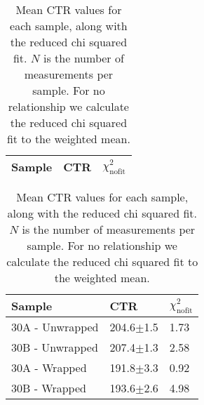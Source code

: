 \begin{table}
\caption{Mean CTR values for each sample, along with the reduced chi squared fit. $N$ is the number of measurements per sample. For no relationship we calculate the reduced chi squared fit to the weighted mean.}
\label{tab:doiresults-ProteusUnwrapped}
\begin{tabular}{lll}
\toprule
Sample &            CTR &   $\chi^2_\text{nofit}$ \\
\midrule
\bottomrule
\end{tabular}
\end{table}

\begin{table}
\caption{\label{tab:doiresults} Mean CTR values for each sample, along with the reduced chi squared fit. $N$ is the number of measurements per sample. For no relationship we calculate the reduced chi squared fit to the weighted mean.}
\begin{tabular}{lll}
\hline
Sample &            CTR &   $\chi^2_\text{nofit}$ \\
\hline
   30A - Unwrapped &  204.6$\pm$1.5 &  1.73 \\
   30B - Unwrapped &  207.4$\pm$1.3 &  2.58 \\
   30A - Wrapped &  191.8$\pm$3.3 &  0.92 \\
   30B - Wrapped &  193.6$\pm$2.6 &  4.98 \\
\hline
\end{tabular}
\end{table}